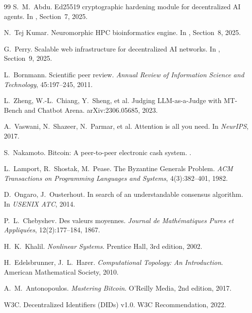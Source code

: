 \documentclass[11pt,a4paper]{article}
\theoremstyle{plain}
\theoremstyle{definition}
\theoremstyle{remark}
\begin{document}
\begin{thebibliography}{99}
S.~M.~Abdu.
\newblock Ed25519 cryptographic hardening module for decentralized AI agents.
\newblock In \cite{openclaw_v4}, Section~7, 2025.

N.~Tej Kumar.
\newblock Neuromorphic HPC bioinformatics engine.
\newblock In \cite{openclaw_v4}, Section~8, 2025.

G.~Perry.
\newblock Scalable web infrastructure for decentralized AI networks.
\newblock In \cite{openclaw_v4}, Section~9, 2025.

L.~Bornmann.
\newblock Scientific peer review.
\newblock \emph{Annual Review of Information Science and Technology},
  45:197--245, 2011.

L.~Zheng, W.-L.~Chiang, Y.~Sheng, et al.
\newblock Judging LLM-as-a-Judge with MT-Bench and Chatbot Arena.
\newblock arXiv:2306.05685, 2023.

A.~Vaswani, N.~Shazeer, N.~Parmar, et al.
\newblock Attention is all you need.
\newblock In \emph{NeurIPS}, 2017.

S.~Nakamoto.
\newblock Bitcoin: A peer-to-peer electronic cash system.
.

L.~Lamport, R.~Shostak, M.~Pease.
\newblock The Byzantine Generals Problem.
\newblock \emph{ACM Transactions on Programming Languages and Systems},
  4(3):382--401, 1982.

D.~Ongaro, J.~Ousterhout.
\newblock In search of an understandable consensus algorithm.
\newblock In \emph{USENIX ATC}, 2014.

P.~L.~Chebyshev.
\newblock Des valeurs moyennes.
\newblock \emph{Journal de Math\'ematiques Pures et Appliqu\'ees},
  12(2):177--184, 1867.

H.~K.~Khalil.
\newblock \emph{Nonlinear Systems}.
\newblock Prentice Hall, 3rd edition, 2002.

H.~Edelsbrunner, J.~L.~Harer.
\newblock \emph{Computational Topology: An Introduction}.
\newblock American Mathematical Society, 2010.

A.~M.~Antonopoulos.
\newblock \emph{Mastering Bitcoin}.
\newblock O'Reilly Media, 2nd edition, 2017.

W3C.
\newblock Decentralized Identifiers (DIDs) v1.0.
\newblock W3C Recommendation, 2022.


\end{thebibliography}
\end{document}
